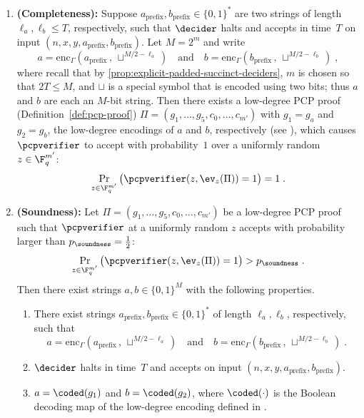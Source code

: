 \begin{theorem}
  \begin{enumerate}
  \item[3.]
    \textbf{(Completeness):} Suppose $a_{\mathrm{prefix}}, b_{\mathrm{prefix}}
    \in \{0, 1\}^*$ are two strings of length $\ell_a, \ell_b \leq T$,
    respectively, such that $\decider$ halts and accepts in time~$T$ on input $(n, x, y,
    a_{\mathrm{prefix}}, b_{\mathrm{prefix}})$.
    Let $M = 2^m$ and write
    \begin{equation*}
      a = \mathrm{enc}_\Gamma(a_{\mathrm{prefix}}\,,\, \sqcup^{M/2 - \ell_a})
      \quad
      \text{and}
      \quad
      b = \mathrm{enc}_\Gamma(b_{\mathrm{prefix}}\,,\, \sqcup^{M/2 - \ell_b})\;,
    \end{equation*}
    where recall that by
    \cref{prop:explicit-padded-succinct-deciders}, $m$ is chosen so that $2T\leq M$, and $\sqcup$ is a special symbol that
    is encoded using two bits; thus $a$ and $b$ are each an $M$-bit string.
    Then there exists a low-degree PCP proof (Definition~\ref{def:pcp-proof})
    $\Pi = (g_1, \ldots, g_5, c_0, \ldots, c_{m'})$ with $g_1 = g_a$ and $g_2 =
    g_b$, the low-degree encodings of $a$ and $b$, respectively (see
    ), which causes $\pcpverifier$ to accept with
    probability~$1$ over a uniformly random $z \in \F_q^{m'}$:
    \[ \Pr_{z \in \F_q^{m'}}\big(\pcpverifier(z, \ev_{z}(\Pi)) = 1\big) = 1\;. \]
  \item[4.]
    \textbf{(Soundness):} Let $\Pi = (g_1, \ldots, g_5, c_0, \ldots, c_{m'})$ be a
    low-degree PCP proof such that $\pcpverifier$ at a uniformly random $z$
    accepts with probability larger than $p_{\soundness} =\frac{1}{2}$:
    \[ \Pr_{z \in \F_q^{m'}}\big( \pcpverifier(z, \ev_{z}(\Pi)) = 1\big) >
      p_{\soundness}\;. \] Then there exist strings $a, b \in \{0, 1\}^{M}$ with the
    following properties.
    \begin{enumerate}
    \item There exist strings $a_{\mathrm{prefix}}, b_{\mathrm{prefix}} \in \{0,
      1\}^*$ of length $\ell_a, \ell_b$, respectively, such that
      \begin{equation*}
        a = \mathrm{enc}_\Gamma(a_{\mathrm{prefix}}\,,\, \sqcup^{M/2 - \ell_a})
        \quad
        \text{and}
        \quad
        b = \mathrm{enc}_\Gamma(b_{\mathrm{prefix}}\,,\, \sqcup^{M/2 - \ell_b})\;.
      \end{equation*}
    \item $\decider$ halts in time~$T$ and accepts on input $(n, x, y, a_{\mathrm{prefix}},
      b_{\mathrm{prefix}})$.
    \item $a = \coded(g_1)$ and $b = \coded(g_2)$, where $\coded(\cdot)$ is the
      Boolean decoding map of the low-degree encoding defined in
      .
\end{enumerate}

  \end{enumerate}
\end{theorem}

